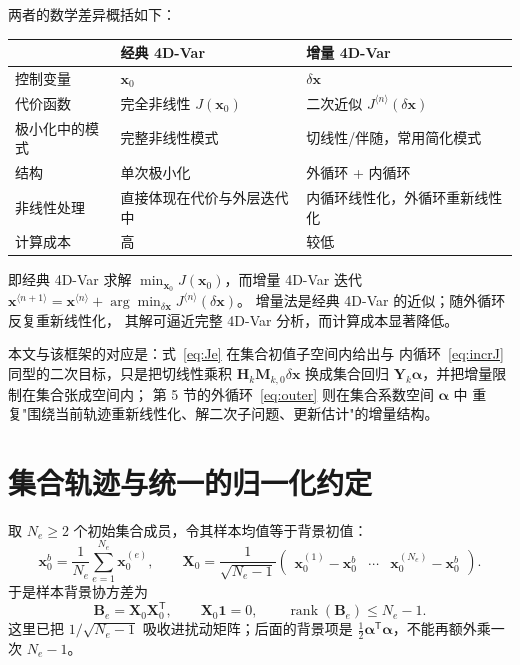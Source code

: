 \documentclass[11pt,a4paper]{article}
\newcommand{\T}{\mathsf T}
\newcommand{\xx}{\mathbf x}
\newcommand{\avec}{\bm\alpha}
\begin{document}
两者的数学差异概括如下：
\begin{center}
\small
\begin{tabularx}{\textwidth}{@{}p{}
 >{\raggedright\arraybackslash}X
 >{\raggedright\arraybackslash}X@{}}
\toprule
 & 经典 4D-Var & 增量 4D-Var\\
\midrule
控制变量 & $\xx_0$ & $\delta\xx$\\
代价函数 & 完全非线性 $J(\xx_0)$ & 二次近似 $J^{\langle n\rangle}(\delta\xx)$\\
极小化中的模式 & 完整非线性模式 & 切线性/伴随，常用简化模式\\
结构 & 单次极小化 & 外循环 + 内循环\\
非线性处理 & 直接体现在代价与外层迭代中 & 内循环线性化，外循环重新线性化\\
计算成本 & 高 & 较低\\
\bottomrule
\end{tabularx}
\end{center}
即经典 4D-Var 求解 $\min_{\xx_0}J(\xx_0)$，而增量 4D-Var 迭代
$\xx^{\langle n+1\rangle}
=\xx^{\langle n\rangle}
+\arg\min_{\delta\xx}J^{\langle n\rangle}(\delta\xx)$。
增量法是经典 4D-Var 的近似；随外循环反复重新线性化，
其解可逼近完整 4D-Var 分析，而计算成本显著降低。

本文与该框架的对应是：式~\eqref{eq:Je} 在集合初值子空间内给出与
内循环~\eqref{eq:incrJ} 同型的二次目标，只是把切线性乘积
$\mathbf H_k\mathbf M_{k,0}\delta\xx$ 换成集合回归
$\mathbf Y_k\avec$，并把增量限制在集合张成空间内；
第 5 节的外循环~\eqref{eq:outer} 则在集合系数空间 $\avec$ 中
重复"围绕当前轨迹重新线性化、解二次子问题、更新估计"的增量结构。

\section{集合轨迹与统一的归一化约定}

取 $N_e\geq2$ 个初始集合成员，令其样本均值等于背景初值：
\begin{equation}
 \xx_0^b=\frac1{N_e}\sum_{e=1}^{N_e}\xx_0^{(e)},\qquad
 \mathbf X_0=\frac1{\sqrt{N_e-1}}
 \begin{pmatrix}\xx_0^{(1)}-\xx_0^b&\cdots&\xx_0^{(N_e)}-\xx_0^b\end{pmatrix}.
 \label{eq:X0}
\end{equation}
于是样本背景协方差为
\begin{equation}
 \mathbf B_e=\mathbf X_0\mathbf X_0^\T,\qquad
 \mathbf X_0\mathbf 1=0,\qquad \operatorname{rank}(\mathbf B_e)\leq N_e-1.
\end{equation}
这里已把 $1/\sqrt{N_e-1}$ 吸收进扰动矩阵；后面的背景项是
$\tfrac12\avec^\T\avec$，不能再额外乘一次 $N_e-1$。
\end{document}
